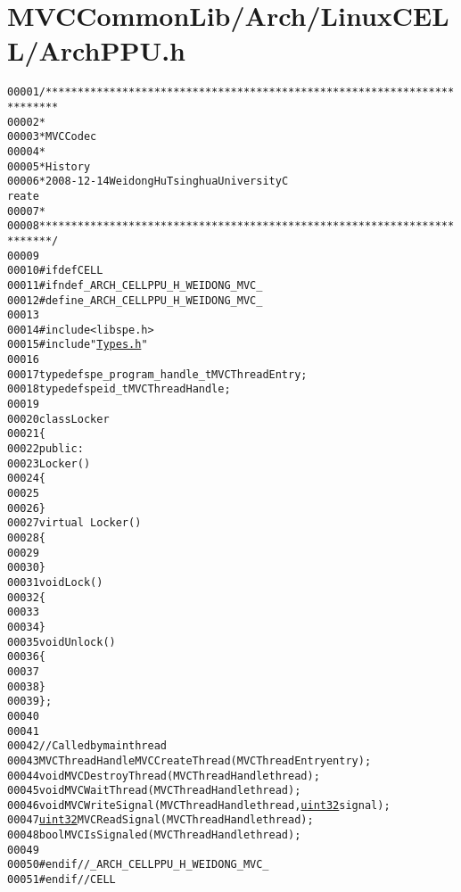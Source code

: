 \hypertarget{_arch_p_p_u_8h_source}{
\section{MVCCommonLib/Arch/LinuxCELL/ArchPPU.h}
}


\begin{footnotesize}\begin{alltt}
00001 \textcolor{comment}{/************************************************************************}
00002 \textcolor{comment}{ *}
00003 \textcolor{comment}{ * MVC Codec}
00004 \textcolor{comment}{ * }
00005 \textcolor{comment}{ * History}
00006 \textcolor{comment}{ * 2008-12-14           Weidong Hu              Tsinghua University             C
      reate}
00007 \textcolor{comment}{ * }
00008 \textcolor{comment}{ ************************************************************************/}
00009 
00010 \textcolor{preprocessor}{#ifdef CELL}
00011 \textcolor{preprocessor}{}\textcolor{preprocessor}{#ifndef \_ARCH\_CELLPPU\_H\_WEIDONG\_MVC\_}
00012 \textcolor{preprocessor}{}\textcolor{preprocessor}{#define \_ARCH\_CELLPPU\_H\_WEIDONG\_MVC\_}
00013 \textcolor{preprocessor}{}
00014 \textcolor{preprocessor}{#include <libspe.h>}
00015 \textcolor{preprocessor}{#include "\hyperlink{_types_8h}{Types.h}"}
00016 
00017 \textcolor{keyword}{typedef} spe\_program\_handle\_t MVCThreadEntry;
00018 \textcolor{keyword}{typedef} speid\_t MVCThreadHandle;
00019 
00020 \textcolor{keyword}{class }Locker
00021 \{
00022 \textcolor{keyword}{public}:
00023         Locker()
00024         \{
00025 
00026         \}
00027         \textcolor{keyword}{virtual} ~Locker()
00028         \{
00029 
00030         \}
00031         \textcolor{keywordtype}{void} Lock()
00032         \{
00033 
00034         \}
00035         \textcolor{keywordtype}{void} Unlock()
00036         \{
00037 
00038         \}
00039 \};
00040 
00041 
00042 \textcolor{comment}{// Called by main thread}
00043 MVCThreadHandle MVCCreateThread(MVCThreadEntry entry);
00044 \textcolor{keywordtype}{void} MVCDestroyThread(MVCThreadHandle thread);
00045 \textcolor{keywordtype}{void} MVCWaitThread(MVCThreadHandle thread);
00046 \textcolor{keywordtype}{void} MVCWriteSignal(MVCThreadHandle thread, \hyperlink{_types_8h_a1134b580f8da4de94ca6b1de4d37975e}{uint32} signal);
00047 \hyperlink{_types_8h_a1134b580f8da4de94ca6b1de4d37975e}{uint32} MVCReadSignal(MVCThreadHandle thread);
00048 \textcolor{keywordtype}{bool} MVCIsSignaled(MVCThreadHandle thread);
00049 
00050 \textcolor{preprocessor}{#endif //\_ARCH\_CELLPPU\_H\_WEIDONG\_MVC\_}
00051 \textcolor{preprocessor}{}\textcolor{preprocessor}{#endif //CELL}
\end{alltt}\end{footnotesize}
